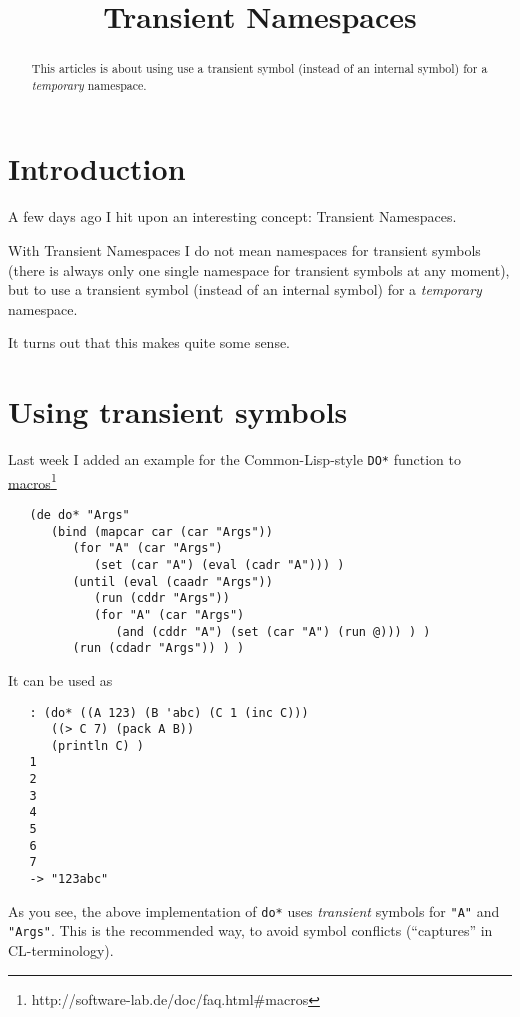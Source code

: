 \title{Transient Namespaces}

\maketitle

\begin{abstract}
  This articles is about using use a transient symbol (instead of an
  internal symbol) for a \textit{temporary} namespace.
\end{abstract}


\section{Introduction}
\label{sec:transient-namespaces-introduction}

A few days ago I hit upon an interesting concept: Transient Namespaces.

With Transient Namespaces I do not mean namespaces for transient symbols (there
is always only one single namespace for transient symbols at any moment), but to
use a transient symbol (instead of an internal symbol) for a \textit{temporary}
namespace.

It turns out that this makes quite some sense.

\section{Using transient symbols}
\label{sec:transient-namespaces-using-transient-symbols}

Last week I added an example for the Common-Lisp-style \texttt{DO*} function to
\underline{macros}\footnote{http://software-lab.de/doc/faq.html\#macros}
\begin{verbatim}
   (de do* "Args"
      (bind (mapcar car (car "Args"))
         (for "A" (car "Args")
            (set (car "A") (eval (cadr "A"))) )
         (until (eval (caadr "Args"))
            (run (cddr "Args"))
            (for "A" (car "Args")
               (and (cddr "A") (set (car "A") (run @))) ) )
         (run (cdadr "Args")) ) )
\end{verbatim}

It can be used as
\begin{verbatim}
   : (do* ((A 123) (B 'abc) (C 1 (inc C)))
      ((> C 7) (pack A B))
      (println C) )
   1
   2
   3
   4
   5
   6
   7
   -> "123abc"
\end{verbatim}

As you see, the above implementation of \texttt{do*} uses \textit{transient} symbols for
\texttt{"A"} and \texttt{"Args"}. This is the recommended way, to avoid symbol conflicts
(``captures'' in CL-terminology).

